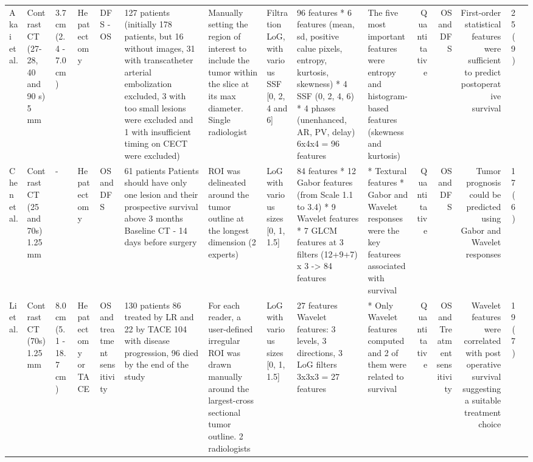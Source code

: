 \begin{landscape}
\begin{table}[!htp]
\begin{tabular}{lp{1.5cm}p{1.5cm}p{2cm}p{2.5cm}p{3cm}p{3cm}p{2cm}p{3cm}p{2cm}rrrrr}
Akai et al. &Contrast CT (27-28, 40 and 90 s) 5 mm &3.7 cm (2.4 - 7.0 cm) &Hepatectomy &DFS - OS &127 patients (initially 178 patients, but 16 without images, 31 with transcatheter arterial embolization excluded, 3 with too small lesions were excluded and 1 with insufficient timing on CECT were excluded) &Manually setting the region of interest to include the tumor within the slice at its max diameter. Single radiologist &Filtration LoG, with various SSF [0, 2, 4 and 6] &96 features * 6 features (mean, sd, positive calue pixels, entropy, kurtosis, skewness) * 4 SSF (0, 2, 4, 6) * 4 phases (unenhanced, AR, PV, delay) 6x4x4 = 96 features &The five most important features were entropy and histogram-based features (skewness and kurtosis) &Quantitative &OS and DFS &First-order statistical features were sufficient to predict postoperative survival &25 (9) \\
Chen et al. &Contrast CT (25 and 70s) 1.25 mm &- &Hepatectomy &OS and DFS &61 patients Patients should have only one lesion and their prospective survival above 3 months Baseline CT - 14 days before surgery &ROI was delineated around the tumor outline at the longest dimension (2 experts) &LoG with various sizes [0, 1, 1.5] &84 features * 12 Gabor features (from Scale 1.1 to 3.4) * 9 Wavelet features * 7 GLCM features at 3 filters (12+9+7) x 3 -> 84 features &* Textural features * Gabor and Wavelet responses were the key featurees associated with survival &Quantitative &OS and DFS &Tumor prognosis could be predicted using Gabor and Wavelet responses &17 (6) \\
Li et al. &Contrast CT (70s) 1.25 mm &8.0 cm (5.1 - 18.7 cm) &Hepatectomy or TACE &OS and treatment sensitivity &130 patients 86 treated by LR and 22 by TACE 104 with disease progression, 96 died by the end of the study &For each reader, a user-defined irregular ROI was drawn manually around the largest-cross sectional tumor outline. 2 radiologists &LoG with various sizes [0, 1, 1.5] &27 features Wavelet features: 3 levels, 3 directions, 3 LoG filters 3x3x3 = 27 features &* Only Wavelet features computed and 2 of them were related to survival &Quantitative &OS and Treatment sensitivity &Wavelet features were correlated with post operative survival suggesting a suitable treatment choice &19 (7) \\

\end{tabular}
\end{table}
\end{landscape}
